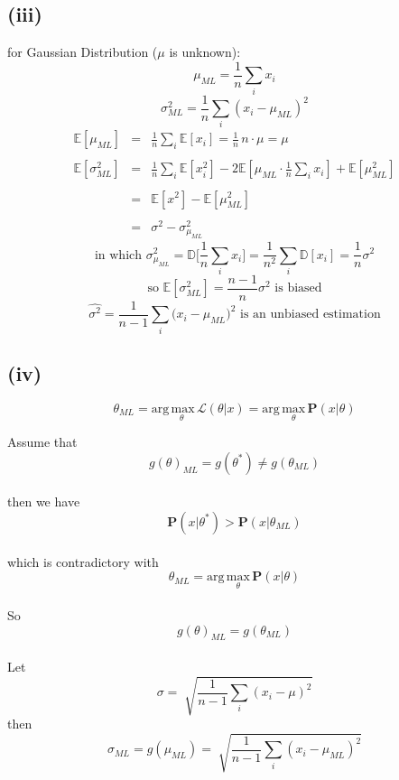 \documentclass[twoside,11pt]{homework}
\begin{document}
\subsection*{(iii)}
for Gaussian Distribution ($\mu$ is unknown): $$\mu_{ML} = \frac{1}{n}\sum_i x_i$$
$$\sigma_{ML}^2 = \frac{1}{n}\sum_i (x_i - \mu_{ML})^2$$
\begin{eqnarray*}
\mathbb{E}[\mu_{ML}] &=& \frac{1}{n}\sum_i \mathbb{E}[x_i] = \frac{1}{n}\,n\cdot\mu = \mu\\\\
\mathbb{E}[\sigma_{ML}^2] &=& \frac{1}{n}\sum_i \mathbb{E}[x_i^2]-2\mathbb{E}[\mu_{ML}\cdot\frac{1}{n}\sum_i x_i] + \mathbb{E}[\mu_{ML}^2]\\\\
&=& \mathbb{E}[x^2] - \mathbb{E}[\mu_{ML}^2]\\\\
&=& \sigma^2-\sigma_{\mu_{ML}}^2
\end{eqnarray*}
$$\mbox{in which }\sigma_{\mu_{ML}}^2=\mathbb{D}\big[\frac{1}{n}\sum_i x_i\big]=
\frac{1}{n^2}\sum_i \mathbb{D}[x_i]=\frac{1}{n}\sigma^2$$
$$\mbox{so  } \mathbb{E}[\sigma_{ML}^2]=\frac{n-1}{n}\sigma^2\mbox{  is biased}$$
$$\hat{\sigma^2}=\frac{1}{n-1}\sum_i \big(x_i-\mu_{ML}\big)^2\mbox{  is an unbiased estimation}$$

\subsection*{(iv)}
$$\theta_{ML} = \mathrm{arg}\underset{\theta}{\mathrm{\,max}}\,\mathcal{L}(\theta|x)=\mathrm{arg}\underset{\theta}{\mathrm{\,max\,}}\mathbf{P}(x|\theta)$$

Assume that $$g(\theta)_{ML} = g(\theta^*) \neq g(\theta_{ML})$$\\
then we have $$\mathbf{P}(x|\theta^*)>\mathbf{P}(x|\theta_{ML})$$\\
which is contradictory with $$\theta_{ML}=\mathrm{arg}\underset{\theta}{\mathrm{\,max\,}}\mathbf{P}(x|\theta)$$\\
So $$g(\theta)_{ML} = g(\theta_{ML})$$\\
Let$$\sigma = \sqrt[]{\frac{1}{n-1}\sum_i(x_i-\mu)^2}$$
then$$\sigma_{ML}=g(\mu_{ML}) = \sqrt[]{\frac{1}{n-1}\sum_i(x_i-\mu_{ML})^2}$$
\end{document}
